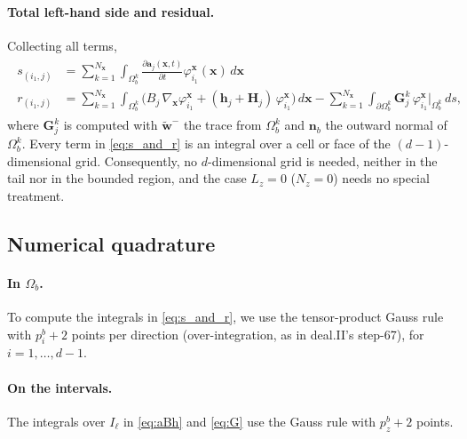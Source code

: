 \documentclass[11pt]{article}
\newcommand{\wt}{\widetilde{\mathbf{w}}}
\newcommand{\bx}{\mathbf{x}}
\newcommand{\bn}{\mathbf{n}}
\newcommand{\ba}{\mathbf{a}}
\begin{document}
	\paragraph{Total left-hand side and residual.} Collecting all terms,
	\begin{align}
		\begin{split}\label{eq:s_and_r}
		s_{(i_1,j)}&=\sum_{k=1}^{N_\bx}\int_{\Omega_b^k} \frac{\partial \ba_j(\bx,t)}{\partial t}\varphi_{i_1}^\bx(\bx)\,d\bx \\
		r_{(i_1,j)}&=\sum_{k=1}^{N_\bx}\int_{\Omega_b^k}\Big(B_j\,\nabla_\bx\varphi^\bx_{i_1}+(\mathbf{h}_j+\mathbf{H}_j)\,\varphi^\bx_{i_1}\Big)\,d\bx-\sum_{k=1}^{N_\bx}\int_{\partial\Omega_b^k}\mathbf{G}^k_j\,\varphi^\bx_{i_1}\big|_{\Omega_b^k}\,ds,
		\end{split}
	\end{align}
	where $\mathbf{G}^k_j$ is computed with $\wt^-$ the trace from $\Omega_b^k$ and $\bn_b$ the outward normal of $\Omega_b^k$. Every term in \eqref{eq:s_and_r} is an integral over a cell or face of the $(d-1)$-dimensional grid. Consequently, no $d$-dimensional grid is needed, neither in the tail nor in the bounded region, and the case $L_z=0$ ($N_z=0$) needs no special treatment.
	
	
	\subsection*{Numerical quadrature}
	
	\paragraph{In $\Omega_b$.} To compute the integrals in \eqref{eq:s_and_r}, we use the tensor-product Gauss rule with $p_i^b+2$ points per direction (over-integration, as in deal.II's step-67), for $i=1,\dots,d-1$.
	
	\paragraph{On the intervals.} The integrals over $I_\ell$ in \eqref{eq:aBh} and \eqref{eq:G} use the Gauss rule with $p^b_z+2$ points.
	
\end{document}
